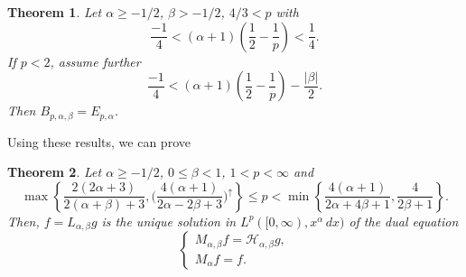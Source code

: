 \documentclass[12pt,leqno]{amsart}
\theoremstyle{plain}
\newtheorem{Thm}{Theorem}[section]
\newcommand{\hab}{\mathcal{H}_{\alpha,\beta}}
\begin{document}
\begin{Thm}
\label{th:Bp=Ep}
Let $\alpha \ge -1/2$, $\beta>-1/2$, $4/3<p$ with
\begin{equation*}
    \frac{-1}4 < (\alpha+1) \left( \frac12-\frac1p \right) < \frac14.
\end{equation*}
If $p<2$, assume further
\begin{equation*}
    \frac{-1}4 < (\alpha+1)\left( \frac12-\frac1p \right)-\frac{|\beta|}2.
\end{equation*}
Then $B_{p,\alpha,\beta} = E_{p,\alpha}$.
\end{Thm}

Using these results, we can prove

\begin{Thm}
Let $\alpha \ge -1/2$, $0\le\beta<1$, $1<p<\infty$ and
\begin{equation*}
    \max\left\{ \frac{2(2\alpha+3)}{2(\alpha+\beta)+3},
      \Big(\frac{4(\alpha+1)}{2\alpha-2\beta+3}\Big)^\uparrow \right\}
    \le p <
    \min\left\{\frac{4(\alpha+1)}{2\alpha+4\beta+1},
      \frac{4}{2\beta+1}\right\}.
\end{equation*}
Then, $f = L_{\alpha,\beta}g$ is the unique solution in
$L^p([0,\infty),x^{\alpha}\,dx)$ of the dual equation
\begin{equation*}
    \left\{
      \begin{array}{l}
         M_{\alpha,\beta}f = \hab g, \\[3pt]
         M_{\alpha}f = f.
      \end{array}
    \right.
\end{equation*}
\end{Thm}
\end{document}
